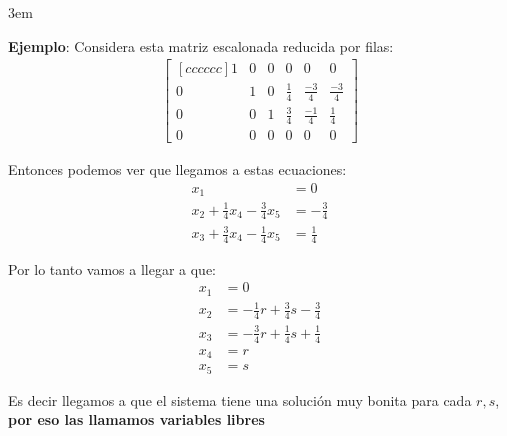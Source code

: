 \documentclass[12pt, fleqn]{report}                             %
\newenvironment{SmallIndentation}[1][0.75em]                    %
        {\begin{adjustwidth}{#1}{}\begin{footnotesize}}             %
        {\end{footnotesize}\end{adjustwidth}}                       %
\theoremstyle{break}                                            %
\begin{document}
                \begin{SmallIndentation}[3em]
                    \textbf{Ejemplo}:
                    Considera esta matriz escalonada reducida por filas:
                    \begin{align*}
                        \begin{bmatrix}[c c c c c c]
                            1&0&0&0&0&0                                     \\
                            0&1&0&\frac{1}{4}&\frac{-3}{4}&\frac{-3}{4}     \\
                            0&0&1&\frac{3}{4}&\frac{-1}{4}&\frac{1}{4}      \\
                            0&0&0&0&0&0
                        \end{bmatrix}
                    \end{align*}

                    Entonces podemos ver que llegamos a estas ecuaciones:
                    \begin{align*}
                        x_1 &= 0                                                \\
                        x_2 + \frac{1}{4}x_4 - \frac{3}{4}x_5 &= -\frac{3}{4}   \\
                        x_3 + \frac{3}{4}x_4 - \frac{1}{4}x_5 &= \frac{1}{4}
                    \end{align*}

                    Por lo tanto vamos a llegar a que:
                    \begin{align*}
                        x_1 &= 0                                            \\
                        x_2 &= -\frac{1}{4}r + \frac{3}{4}s - \frac{3}{4}   \\
                        x_3 &= -\frac{3}{4}r + \frac{1}{4}s + \frac{1}{4}   \\
                        x_4 &= r                                            \\
                        x_5 &= s
                    \end{align*}  

                    Es decir llegamos a que el sistema tiene una solución
                    muy bonita para cada $r, s$, \textbf{por eso las llamamos
                    variables libres}
                
                \end{SmallIndentation}
\end{document}
